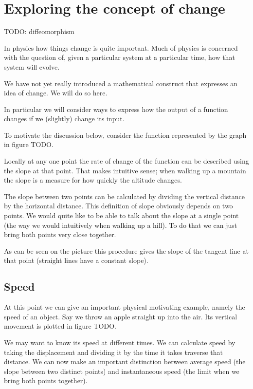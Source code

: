 \section{Exploring the concept of change}
TODO: diffeomorphism

In physics how things change is quite important. Much of physics is concerned with the question of, given a particular system at a particular time, how that system will evolve.

We have not yet really introduced a mathematical construct that expresses an idea of change. We will do so here.

In particular we will consider ways to express how the output of a function changes if we (slightly) change its input.

To motivate the discussion below, consider the function represented by the graph in figure TODO. 

Locally at any one point the rate of change of the function can be described using the slope at that point. That makes intuitive sense; when walking up a mountain the slope is a measure for how quickly the altitude changes.

The slope between two points can be calculated by dividing the vertical distance by the horizontal distance. This definition of slope obviously depends on two points. We would quite like to be able to talk about the slope at a single point (the way we would intuitively when walking up a hill). To do that we can just bring both points very close together.

As can be seen on the picture this procedure gives the slope of the tangent line at that point (straight lines have a constant slope).

\subsection{Speed}

At this point we can give an important physical motivating example, namely the speed of an object. Say we throw an apple straight up into the air. Its vertical movement is plotted in figure TODO.

We may want to know its speed at different times. We can calculate speed by taking the displacement and dividing it by the time it takes traverse that distance. We can now make an important distinction between average speed (the slope between two distinct points) and instantaneous speed (the limit when we bring both points together).

